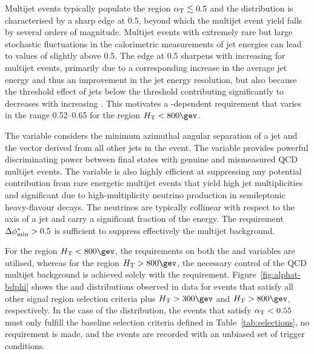 Multijet events typically populate the region $\alpha_{\text{T}} \lesssim 0.5$
and the \alphat distribution is characterised by a sharp edge at 0.5,
beyond which the multijet event yield falls by several orders of
magnitude. Multijet events with extremely rare but large stochastic
fluctuations in the calorimetric measurements of jet energies can lead
to values of \alphat slightly above 0.5. The edge at 0.5 sharpens with
increasing \scalht for multijet events, primarily due to a
corresponding increase in the average jet energy and thus an
improvement in the jet energy resolution, but also because the
threshold effect of jets below the \Pt threshold contributing
significantly to \mht decreases with increasing \scalht. This
motivates a \scalht-dependent \alphat requirement that varies in the
range 0.52--0.65 for the region $\scalht < 800\gev$. 

The \bdphi variable considers the minimum azimuthal angular separation
of a jet and the \mht vector derived from all other jets in the
event. The \bdphi variable provides powerful discriminating power
between final states with genuine \ETmiss and mismeasured QCD multijet
events. The variable is also highly efficient at suppressing any
potential contribution from rare energetic multijet events that yield
high jet multiplicities and significant \ETmiss due to
high-multiplicity neutrino production in semileptonic heavy-flavour
decays. The neutrinos are typically collinear with respect to the axis
of a jet and carry a significant fraction of the energy. The
requirement $\mbox{$\Delta\phi^{*}_{\rm min}$} > 0.5$ is sufficient to suppress effectively the
multijet background.

For the region $\scalht < 800\gev$, the requirements on both the
\alphat and \bdphi variables are utilised, whereas for the region
$\scalht > 800\gev$, the necessary control of the QCD multijet
background is achieved solely with the \bdphi
requirement. Figure~\ref{fig:alphat-bdphi} shows the \alphat and \bdphi
distributions observed in data for events that satisfy all other
signal region selection criteria plus $\scalht > 300\gev$ and $\scalht
> 800\gev$, respectively. In the case of the \alphat distribution, the
events that satisfy $\alpha_{\text{T}} < 0.55$ must only fulfill the baseline
selection criteria defined in Table~\ref{tab:selections}, no \mht
requirement is made, and the events are recorded with an unbiased set
of trigger \scalht conditions.

